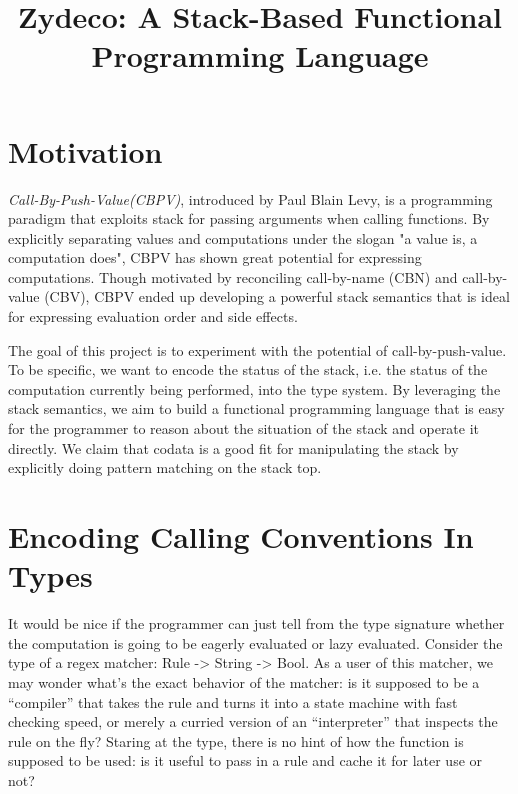 \documentclass[acmsmall,nonacm]{acmart}
\title{Zydeco: A Stack-Based Functional Programming Language}
\begin{document}
\renewcommand{\thesection}{\Alph{section}}

\maketitle

\section{Motivation}

\textit{Call-By-Push-Value(CBPV)}, introduced by Paul Blain Levy, is a programming paradigm that exploits stack for passing arguments when calling functions. By explicitly separating values and computations under the slogan "a value is, a computation does", CBPV has shown great potential for expressing computations. Though motivated by reconciling call-by-name (CBN) and call-by-value (CBV), CBPV ended up developing a powerful stack semantics that is ideal for expressing evaluation order and side effects.

The goal of this project is to experiment with the potential of call-by-push-value. To be specific, we want to encode the status of the stack, i.e. the status of the computation currently being performed, into the type system. By leveraging the stack semantics, we aim to build a functional programming language that is easy for the programmer to reason about the situation of the stack and operate it directly. We claim that codata is a good fit for manipulating the stack by explicitly doing pattern matching on the stack top.

\section{Encoding Calling Conventions In Types}

It would be nice if the programmer can just tell from the type signature whether the computation is going to be eagerly evaluated or lazy evaluated. Consider the type of a regex matcher: Rule -> String -> Bool. As a user of this matcher, we may wonder what's the exact behavior of the matcher: is it supposed to be a ``compiler'' that takes the rule and turns it into a state machine with fast checking speed, or merely a curried version of an ``interpreter'' that inspects the rule on the fly? Staring at the type, there is no hint of how the function is supposed to be used: is it useful to pass in a rule and cache it for later use or not?

\begin{listing}[h]
    \begin{multicols}{3}
        \inputminted{Haskell}{examples/mappre1.zydeco}
        \vfill
        \inputminted{Haskell}{examples/mappre2.zydeco}
        \vfill
    \end{multicols}
    \begin{multicols}{2}
        \inputminted{Haskell}{examples/map1.zydeco}
        \vfill
        \inputminted{Haskell}{examples/map2.zydeco}
        \vfill
    \end{multicols}
    \label{code: map}
\end{listing}
\end{document}
